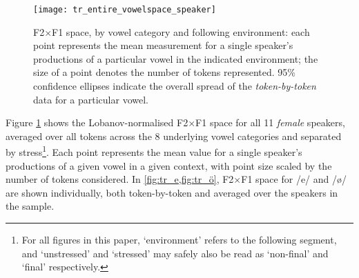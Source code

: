 %


\begin{figure}[ht]
  \centering
  \texttt{[image: tr\_entire\_vowelspace\_speaker]}
  \caption[F2$\times$F1 space, individual speaker means only.]{F2$\times$F1 space, by vowel category and following environment: each point represents the mean measurement for a single speaker's productions of a particular vowel in the indicated environment; the size of a point denotes the number of tokens represented. 95\% confidence ellipses indicate the overall spread of the \emph{token-by-token} data for a particular vowel.}
  \label{fig:tr_vowelspace_speaker}
\end{figure}

Figure \ref{fig:tr_vowelspace_speaker} shows the Lobanov-normalised F2$\times$F1 space for all 11 \emph{female} speakers, averaged over all tokens across the 8 underlying vowel categories and separated by stress\footnote{For all figures in this paper, `environment' refers to the following segment, and `unstressed' and `stressed' may safely also be read as `non-final' and `final' respectively.}. Each point represents the mean value for a single speaker's productions of a given vowel in a given context, with point size scaled by the number of tokens considered. In \cref{fig:tr_e,fig:tr_ö}, F2$\times$F1 space for /e/ and /\o/ are shown individually, both token-by-token and averaged over the speakers in the sample.

